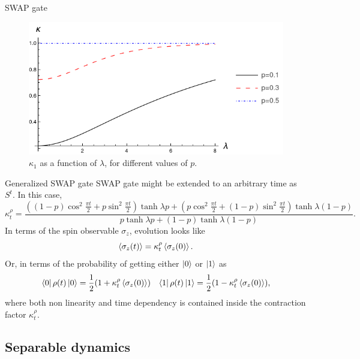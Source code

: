 \documentclass{cubeamer}
\begin{document}
\begin{frame}{SWAP gate}
    \begin{figure}[h!]
        \centering
        \includegraphics[width=0.6\linewidth]{../notes/log/maxent/figures/ContractionFactorSWAP_2D_lambda0to8.png}
        \caption{$\kappa_{1}$ as a function of $\lambda$, for different values of $p$.}
        \label{fig:SWAPFactor2D}
      \end{figure}
\end{frame}

\begin{frame}{Generalized SWAP gate}
    SWAP gate might be extended to an arbitrary time as $S^{t}$. In this case, 
    \begin{equation*}
        \kappa_{t}^{\rho}=\frac{((1-p)\cos^{2}{\frac{\pi t}{2}}+p\sin^{2}{\frac{\pi t}{2}})\tanh{\lambda p}+(p\cos^{2}{\frac{\pi t}{2}}+(1-p)\sin^{2}{\frac{\pi t}{2}})\tanh{\lambda (1-p)}}{
          p\tanh{\lambda p}+(1-p)\tanh{\lambda (1-p)}}.
      \end{equation*}
      In terms of the spin observable $\sigma_{z}$, evolution looks like
\begin{equation}
  \expval{\sigma_{z}(t)}=\kappa_{t}^{\rho}\expval{\sigma_{z}(0)}.
\end{equation}
Or, in terms of the probability of getting either $\ket{0}$ or $\ket{1}$ as
 \begin{align}
  \bra{0}\rho(t)\ket{0}=\frac{1}{2}(1+\kappa_{t}^{\rho}\expval{\sigma_{z}(0)}) && \bra{1}\rho(t)\ket{1}=\frac{1}{2}(1-\kappa_{t}^{\rho}\expval{\sigma_{z}(0)}),
 \end{align}
 where both non linearity and time dependency is contained inside the contraction factor $\kappa_{t}^{\rho}$. 
\end{frame}

\subsection{Separable dynamics}
\end{document}
